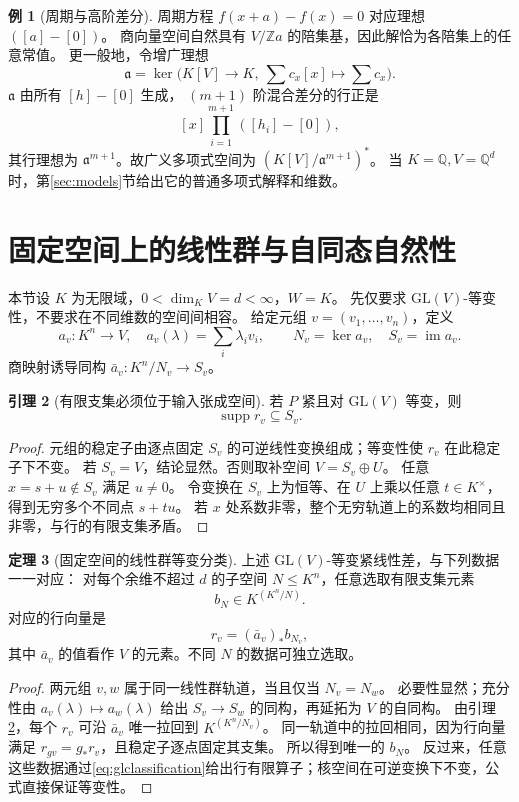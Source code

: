 \documentclass[UTF8,11pt,a4paper]{ctexart}
\theoremstyle{definition}
\newtheorem{theorem}{定理}[section]
\newtheorem{lemma}[theorem]{引理}
\newtheorem{example}[theorem]{例}
\newcommand{\Q}{\mathbb Q}
\newcommand{\Z}{\mathbb Z}
\newcommand{\im}{\operatorname{im}}
\newcommand{\supp}{\operatorname{supp}}
\begin{document}
\begin{example}[周期与高阶差分]
周期方程 $f(x+a)-f(x)=0$ 对应理想 $([a]-[0])$。
商向量空间自然具有 $V/\Z a$ 的陪集基，因此解恰为各陪集上的任意常值。
更一般地，令增广理想
\[
 \mathfrak a=\ker\bigl(K[V]\to K,\ \sum c_x[x]\mapsto\sum c_x\bigr).
\]
$\mathfrak a$ 由所有 $[h]-[0]$ 生成，
$(m+1)$ 阶混合差分的行正是
\[
 [x]\prod_{i=1}^{m+1}([h_i]-[0]),
\]
其行理想为 $\mathfrak a^{m+1}$。故广义多项式空间为 $(K[V]/\mathfrak a^{m+1})^*$。
当 $K=\Q,V=\Q^d$ 时，第\ref{sec:models}节给出它的普通多项式解释和维数。
\end{example}

\section{固定空间上的线性群与自同态自然性}\label{sec:fixednatural}
本节设 $K$ 为无限域，$0<\dim_KV=d<\infty$，$W=K$。
先仅要求 $\mathrm{GL}(V)$-等变性，不要求在不同维数的空间间相容。
给定元组 $v=(v_1,\ldots,v_n)$，定义
\[
 a_v:K^n\to V,\quad a_v(\lambda)=\sum_i\lambda_iv_i,
 \qquad N_v=\ker a_v,\quad S_v=\im a_v.
\]
商映射诱导同构 $\bar a_v:K^n/N_v\to S_v$。

\begin{lemma}[有限支集必须位于输入张成空间]\label{lem:supportspan}
若 $P$ 紧且对 $\mathrm{GL}(V)$ 等变，则
\[
 \supp r_v\subseteq S_v.
\]
\end{lemma}
\begin{proof}
元组的稳定子由逐点固定 $S_v$ 的可逆线性变换组成；等变性使 $r_v$ 在此稳定子下不变。
若 $S_v=V$，结论显然。否则取补空间 $V=S_v\oplus U$。
任意 $x=s+u\notin S_v$ 满足 $u\ne0$。
令变换在 $S_v$ 上为恒等、在 $U$ 上乘以任意 $t\in K^\times$，得到无穷多个不同点 $s+tu$。
若 $x$ 处系数非零，整个无穷轨道上的系数均相同且非零，与行的有限支集矛盾。
\end{proof}

\begin{theorem}[固定空间的线性群等变分类]\label{thm:glclassification}
上述 $\mathrm{GL}(V)$-等变紧线性差，与下列数据一一对应：
对每个余维不超过 $d$ 的子空间 $N\le K^n$，任意选取有限支集元素
\[
 b_N\in K^{(K^n/N)}.
\]
对应的行向量是
\begin{equation}\label{eq:glclassification}
 r_v=(\bar a_v)_*b_{N_v},
\end{equation}
其中 $\bar a_v$ 的值看作 $V$ 的元素。不同 $N$ 的数据可独立选取。
\end{theorem}
\begin{proof}
两元组 $v,w$ 属于同一线性群轨道，当且仅当 $N_v=N_w$。
必要性显然；充分性由 $a_v(\lambda)\mapsto a_w(\lambda)$ 给出 $S_v\to S_w$ 的同构，再延拓为 $V$ 的自同构。
由引理\ref{lem:supportspan}，每个 $r_v$ 可沿 $\bar a_v$ 唯一拉回到 $K^{(K^n/N_v)}$。
同一轨道中的拉回相同，因为行向量满足 $r_{gv}=g_*r_v$，且稳定子逐点固定其支集。
所以得到唯一的 $b_N$。
反过来，任意这些数据通过\eqref{eq:glclassification}给出行有限算子；核空间在可逆变换下不变，公式直接保证等变性。
\end{proof}
\end{document}
